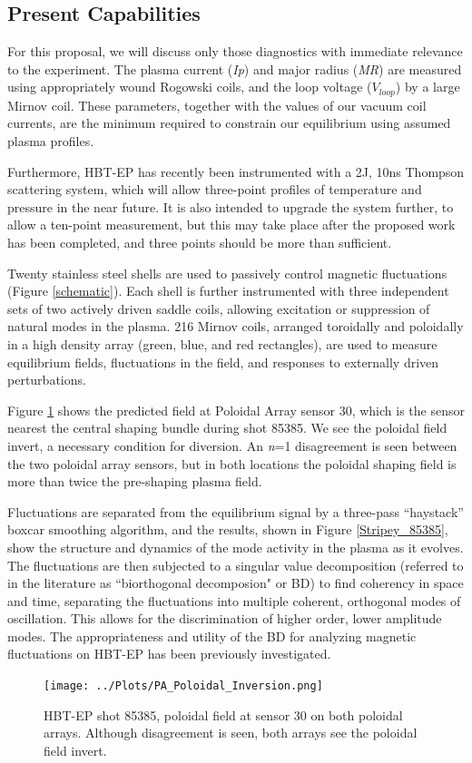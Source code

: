 \documentclass[aps,prl,twocolumn,superscriptaddress,groupedaddress]{revtex4}  %
\begin{document}
\subsection{Present Capabilities}
	For this proposal, we will discuss only those diagnostics with immediate relevance to the experiment.  The plasma current (\textit{Ip}) and major radius (\textit{MR}) are measured using appropriately wound Rogowski coils, and the loop voltage (\textit{$V_{loop}$}) by a large Mirnov coil.  These parameters, together with the values of our vacuum coil currents, are the minimum required to constrain our equilibrium using assumed plasma profiles.\par
	Furthermore, HBT-EP has recently been instrumented with a 2J, 10ns Thompson scattering system, which will allow three-point profiles of temperature and pressure in the near future.  It is also intended to upgrade the system further, to allow a ten-point measurement, but this may take place after the proposed work has been completed, and three points should be more than sufficient.\par
	Twenty stainless steel shells are used to passively control magnetic fluctuations (Figure \ref{schematic}).  Each shell is further instrumented with three independent sets of two actively driven saddle coils, allowing excitation or suppression of natural modes in the plasma.  216 Mirnov coils, arranged toroidally and poloidally in a high density array (green, blue, and red rectangles), are used to measure equilibrium fields, fluctuations in the field, and responses to externally driven perturbations.\par
	Figure \ref{PA_Poloidal_Inversion} shows the predicted field at Poloidal Array sensor 30, which is the sensor nearest the central shaping bundle during shot 85385.  We see the poloidal field invert, a necessary condition for diversion.  An \textit{n}=1 disagreement is seen between the two poloidal array sensors, but in both locations the poloidal shaping field is more than twice the pre-shaping plasma field.\par
	Fluctuations are separated from the equilibrium signal by a three-pass ``haystack'' boxcar smoothing algorithm, and the results, shown in Figure \ref{Stripey_85385}, show the structure and dynamics of the mode activity in the plasma as it evolves.  The fluctuations are then subjected to a singular value decomposition (referred to in the literature as ``biorthogonal decomposion" or BD\cite{de Wit}) to find coherency in space and time, separating the fluctuations into multiple coherent, orthogonal modes of oscillation.  This allows for the discrimination of higher order, lower amplitude modes.  The appropriateness and utility of the BD for analyzing magnetic fluctuations on HBT-EP has been previously investigated\cite{Levesque}.\par
\begin{figure}[t]
\centering
\texttt{[image: ../Plots/PA\_Poloidal\_Inversion.png]}\caption{HBT-EP shot 85385, poloidal field at sensor 30 on both poloidal arrays.  Although disagreement is seen, both arrays see the poloidal field invert.}
\label{PA_Poloidal_Inversion}
\end{figure}
\end{document}
